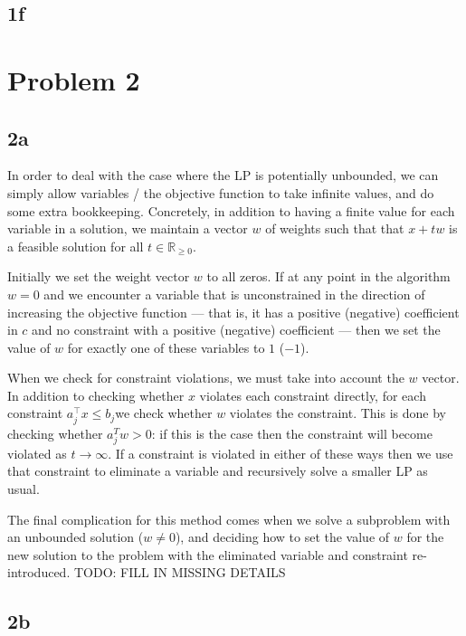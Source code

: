 \documentclass{article}
\newcommand{\constraintj}{$a_j^{\intercal}x \leq b_j$}
\begin{document}
\subsection*{1f}



\section*{Problem 2}
\subsection*{2a}

In order to deal with the case where the LP is potentially unbounded, we can simply 
allow variables / the objective function to take infinite values,
and do some extra bookkeeping. Concretely, in addition to having a finite value
for each variable in a solution, we maintain a vector $w$ of weights 
such that that $x + t w$ is a feasible solution for all $t \in \mathbb{R}_{\geq 0}$.

Initially we set the weight vector $w$ to all zeros. If at any point in the algorithm
$w = 0$ and we encounter a variable that is unconstrained
in the direction of increasing the objective function --- that is, it has a positive
(negative) coefficient in $c$ and no constraint with a positive (negative) coefficient
--- then we set the value of $w$ for exactly one of these variables to $1$ ($-1$).

When we check for constraint violations, we must take into account the $w$ vector.
In addition to checking whether $x$ violates each constraint directly, for each
constraint \constraintj we check whether $w$ violates the constraint. This is done
by checking whether $a_j^T w > 0$: if this is the case then the constraint will
become violated as $t \rightarrow \infty$. If a constraint is violated in either
of these ways then we use that constraint to eliminate a variable and recursively
solve a smaller LP as usual.

The final complication for this method comes when we solve a subproblem with an
unbounded solution ($w \neq 0$), and deciding how to set the value of $w$ for the
new solution to the problem with the eliminated variable and constraint re-introduced.
TODO: FILL IN MISSING DETAILS


\subsection*{2b}
\end{document}
